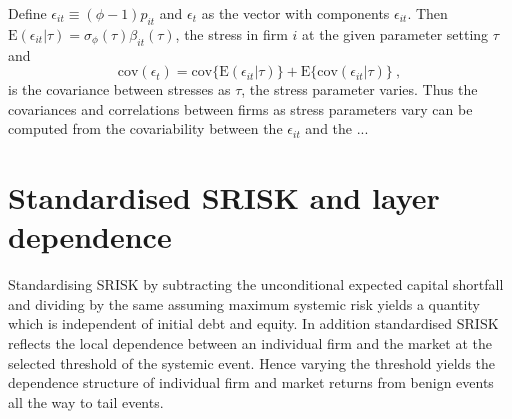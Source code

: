 \documentclass[authoryear]{elsarticle}
\newcommand{\E}{\mathrm{E}}
\newcommand{\e}{\mathrm{e}}
\newcommand{\cov}{\mathrm{cov}}
\newcommand{\eps}{\epsilon}
\newcommand{\Ex}{{\cal E}}
\begin{document}
Define $\eps_{it}\equiv(\phi-1)p_{it}$ and $\eps_t$ as the vector with components $\eps_{it}$.  Then $\E(\eps_{it}|\tau)=\sigma_\phi(\tau)\beta_{it}(\tau)$, the stress in firm $i$ at the given parameter setting $\tau$  and
$$
\cov(\eps_{t})=\cov\{\E(\eps_{it}|\tau)\}+\E\{\cov(\eps_{it}|\tau)\}\ ,
$$
is the covariance between stresses as $\tau$, the stress parameter varies.   Thus the covariances and correlations between firms as stress parameters vary can be computed from the covariability between the $\eps_{it}$ and the ...

\begin{comment}
\subsection{Weihao - Allocating the market put}

The overall market shortfall after allowing for diversification between firms is
$$
p_{mt}\equiv k_+ |1-\e^{-\ell^*_{mt}+\nu_{mt}}|^+
= k_+|\Ex (1-\e^{-\ell^*_{it}+\nu_{it}})|^+
=I(\nu_{mt}<\ell_{mt}^*)k_+\Ex(1-\e^{-\ell^*_{it}+\nu_{it}}) 
$$
and hence the portion attributable to firm $i$ is $k_i(1-\e^{-\ell^*_{it}+\nu_{it}}) I(\nu_{mt}<\ell_{mt}^*)$, its capital shortfall or surplus when the overall market is in a shortfall. The allocation of the stressed expectation $\E(p_{mt})$ is then
$$
k_i\E\{(1-\e^{-\ell^*_{it}+\nu_{it}}) I(\nu_{mt}<\ell_{mt}^*)\}
$$
and applying $\Ex$ to the above expression yields $\E(p_{mt})$.
\end{comment}


\section{Standardised SRISK and layer dependence}

Standardising SRISK by subtracting the unconditional expected capital shortfall and dividing by the same assuming maximum systemic risk yields a quantity which is independent of initial debt and equity. In addition standardised SRISK reflects the local dependence between an individual firm and the market at the selected threshold of the systemic event. Hence varying the threshold yields the dependence structure of individual firm and market returns from benign events all the way to tail events.
\end{document}
